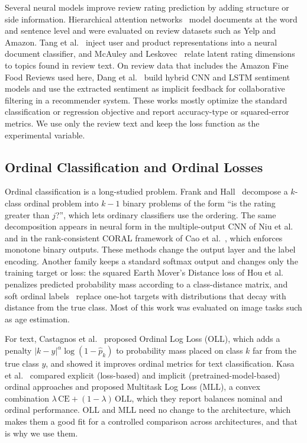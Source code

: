 Several neural models improve review rating prediction by adding structure or side information. Hierarchical attention networks~\cite{yang2016} model documents at the word and sentence level and were evaluated on review datasets such as Yelp and Amazon. Tang et al.~\cite{tang2015} inject user and product representations into a neural document classifier, and McAuley and Leskovec~\cite{mcauley2013} relate latent rating dimensions to topics found in review text. On review data that includes the Amazon Fine Food Reviews used here, Dang et al.~\cite{dang2021} build hybrid CNN and LSTM sentiment models and use the extracted sentiment as implicit feedback for collaborative filtering in a recommender system. These works mostly optimize the standard classification or regression objective and report accuracy-type or squared-error metrics. We use only the review text and keep the loss function as the experimental variable.

\subsection{Ordinal Classification and Ordinal Losses}
Ordinal classification is a long-studied problem. Frank and Hall~\cite{frank2001} decompose a $k$-class ordinal problem into $k-1$ binary problems of the form ``is the rating greater than $j$?'', which lets ordinary classifiers use the ordering. The same decomposition appears in neural form in the multiple-output CNN of Niu et al.~\cite{niu2016} and in the rank-consistent CORAL framework of Cao et al.~\cite{cao2020}, which enforces monotone binary outputs. These methods change the output layer and the label encoding. Another family keeps a standard softmax output and changes only the training target or loss: the squared Earth Mover's Distance loss of Hou et al.~\cite{hou2017} penalizes predicted probability mass according to a class-distance matrix, and soft ordinal labels~\cite{diaz2019} replace one-hot targets with distributions that decay with distance from the true class. Most of this work was evaluated on image tasks such as age estimation.

For text, Castagnos et al.~\cite{castagnos2022} proposed Ordinal Log Loss (OLL), which adds a penalty $|k-y|^{\alpha}\log(1-\hat{p}_k)$ to probability mass placed on class $k$ far from the true class $y$, and showed it improves ordinal metrics for text classification. Kasa et al.~\cite{kasa2024} compared explicit (loss-based) and implicit (pretrained-model-based) ordinal approaches and proposed Multitask Log Loss (MLL), a convex combination $\lambda\,\mathrm{CE} + (1-\lambda)\,\mathrm{OLL}$, which they report balances nominal and ordinal performance. OLL and MLL need no change to the architecture, which makes them a good fit for a controlled comparison across architectures, and that is why we use them.

